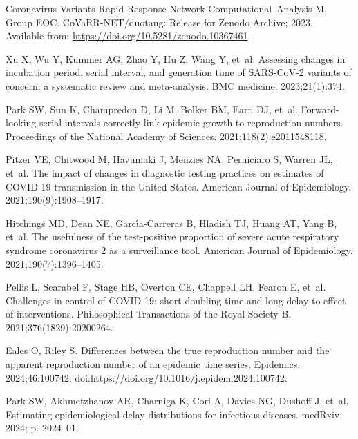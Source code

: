 \documentclass[10pt,letterpaper]{article}
\begin{document}
\begin{thebibliography}{10}
  Coronavirus Variants Rapid Response Network Computational~Analysis M, Group
    EOC. CoVaRR-NET/duotang: Release for Zenodo Archive; 2023.
  \newblock Available from: \url{https://doi.org/10.5281/zenodo.10367461}.
  
  Xu X, Wu Y, Kummer AG, Zhao Y, Hu Z, Wang Y, et~al.
  \newblock Assessing changes in incubation period, serial interval, and
    generation time of SARS-CoV-2 variants of concern: a systematic review and
    meta-analysis.
  \newblock BMC medicine. 2023;21(1):374.
  
  Park SW, Sun K, Champredon D, Li M, Bolker BM, Earn DJ, et~al.
  \newblock Forward-looking serial intervals correctly link epidemic growth to
    reproduction numbers.
  \newblock Proceedings of the National Academy of Sciences.
    2021;118(2):e2011548118.
  
  Pitzer VE, Chitwood M, Havumaki J, Menzies NA, Perniciaro S, Warren JL, et~al.
  \newblock The impact of changes in diagnostic testing practices on estimates of
    {COVID-19} transmission in the {U}nited {S}tates.
  \newblock American Journal of Epidemiology. 2021;190(9):1908--1917.
  
  Hitchings MD, Dean NE, Garc{\'\i}a-Carreras B, Hladish TJ, Huang AT, Yang B,
    et~al.
  \newblock The usefulness of the test-positive proportion of severe acute
    respiratory syndrome coronavirus 2 as a surveillance tool.
  \newblock American Journal of Epidemiology. 2021;190(7):1396--1405.
  
  Pellis L, Scarabel F, Stage HB, Overton CE, Chappell LH, Fearon E, et~al.
  \newblock Challenges in control of {COVID-19}: short doubling time and long
    delay to effect of interventions.
  \newblock Philosophical Transactions of the Royal Society B.
    2021;376(1829):20200264.
  
  Eales O, Riley S.
  \newblock Differences between the true reproduction number and the apparent
    reproduction number of an epidemic time series.
  \newblock Epidemics. 2024;46:100742.
  \newblock doi:{https://doi.org/10.1016/j.epidem.2024.100742}.
  
  Park SW, Akhmetzhanov AR, Charniga K, Cori A, Davies NG, Dushoff J, et~al.
  \newblock Estimating epidemiological delay distributions for infectious
    diseases.
  \newblock medRxiv. 2024; p. 2024--01.
  

\end{thebibliography}
\end{document}
